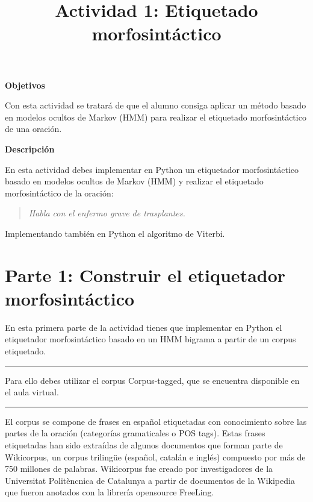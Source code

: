 \documentclass[12pt,a4paper,table]{article}
\title{Actividad 1: Etiquetado morfosintáctico}
\makeatletter
\let\newtitle\@title
\makeatother
\begin{document}
    
    \textcolor{UnirDark}{\Large\bfseries\newtitle}
    





\textbf{Objetivos}

Con esta actividad se tratará de que el alumno consiga aplicar un método
basado en modelos ocultos de Markov (HMM) para realizar el etiquetado
morfosintáctico de una oración.

\textbf{Descripción}

En esta actividad debes implementar en Python un etiquetador
morfosintáctico basado en modelos ocultos de Markov (HMM) y realizar el
etiquetado morfosintáctico de la oración:

\begin{quote}
\emph{Habla con el enfermo grave de trasplantes.}
\end{quote}

Implementando también en Python el algoritmo de Viterbi.

    \section*{Parte 1: Construir el etiquetador morfosintáctico}

En esta primera parte de la actividad tienes que implementar en Python
el etiquetador morfosintáctico basado en un HMM bigrama a partir de un
corpus etiquetado.

\begin{center}\rule{0.5\linewidth}{0.5pt}\end{center}

Para ello debes utilizar el corpus Corpus-tagged, que se encuentra
disponible en el aula virtual.

\begin{center}\rule{0.5\linewidth}{0.5pt}\end{center}

El corpus se compone de frases en español etiquetadas con conocimiento
sobre las partes de la oración (categorías gramaticales o POS tags).
Estas frases etiquetadas han sido extraídas de algunos documentos que
forman parte de Wikicorpus, un corpus trilingüe (español, catalán e
inglés) compuesto por más de 750 millones de palabras. Wikicorpus fue
creado por investigadores de la Universitat Politèncnica de Catalunya a
partir de documentos de la Wikipedia que fueron anotados con la librería
opensource FreeLing.
\end{document}
